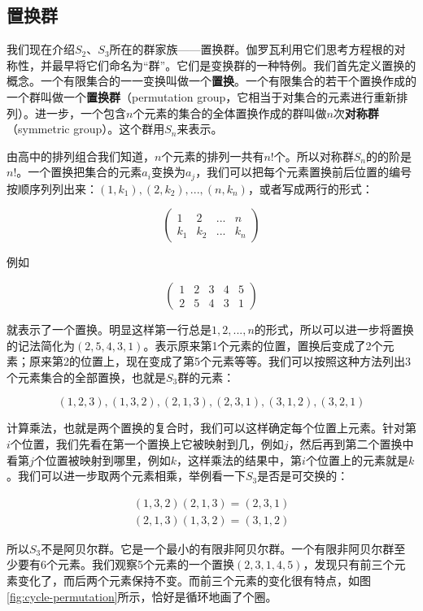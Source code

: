 \documentclass[b5paper]{ctexart}
\begin{document}
\subsection{置换群}
\label{permutation group}
\label{symmetric group}
 

我们现在介绍$S_2$、$S_3$所在的群家族——置换群。伽罗瓦利用它们思考方程根的对称性，并最早将它们命名为“群”。它们是变换群的一种特例。我们首先定义置换的概念。一个有限集合的一一变换叫做一个\textbf{置换}。一个有限集合的若干个置换作成的一个群叫做一个\textbf{置换群}（permutation group，它相当于对集合的元素进行重新排列）。进一步，一个包含$n$个元素的集合的全体置换作成的群叫做$n$次\textbf{对称群}（symmetric group）。这个群用$S_n$来表示。

由高中的排列组合我们知道，$n$个元素的排列一共有$n!$个。所以对称群$S_n$的的阶是$n!$。一个置换把集合的元素$a_i$变换为$a_j$，我们可以把每个元素置换前后位置的编号按顺序列列出来：$(1, k_1), (2, k_2), ..., (n, k_n)$，或者写成两行的形式：

\[
\begin{pmatrix}
1 & 2 & ... & n \\
k_1 & k_2 & ... & k_n
\end{pmatrix}
\]

例如

\[
\begin{pmatrix}
1 & 2 & 3 & 4 & 5 \\
2 & 5 & 4 & 3 & 1
\end{pmatrix}
\]

就表示了一个置换。明显这样第一行总是$1, 2, ..., n$的形式，所以可以进一步将置换的记法简化为$(2, 5, 4, 3, 1)$。表示原来第1个元素的位置，置换后变成了2个元素；原来第2的位置上，现在变成了第5个元素等等。我们可以按照这种方法列出3个元素集合的全部置换，也就是$S_3$群的元素：

\[
(1, 2, 3), (1, 3, 2), (2, 1, 3), (2, 3, 1), (3, 1, 2), (3, 2, 1)
\]

计算乘法，也就是两个置换的复合时，我们可以这样确定每个位置上元素。针对第$i$个位置，我们先看在第一个置换上它被映射到几，例如$j$，然后再到第二个置换中看第$j$个位置被映射到哪里，例如$k$，这样乘法的结果中，第$i$个位置上的元素就是$k$。我们可以进一步取两个元素相乘，举例看一下$S_3$是否是可交换的：

\[
\begin{array}{l}
(1, 3, 2) (2, 1, 3) = (2, 3, 1) \\
(2, 1, 3) (1, 3, 2) = (3, 1, 2)
\end{array}
\]

所以$S_3$不是阿贝尔群。它是一个最小的有限非阿贝尔群。一个有限非阿贝尔群至少要有6个元素。我们观察5个元素的一个置换$(2, 3, 1, 4, 5)$，发现只有前三个元素变化了，而后两个元素保持不变。而前三个元素的变化很有特点，如图\ref{fig:cycle-permutation}所示，恰好是循环地画了个圈。
\end{document}
